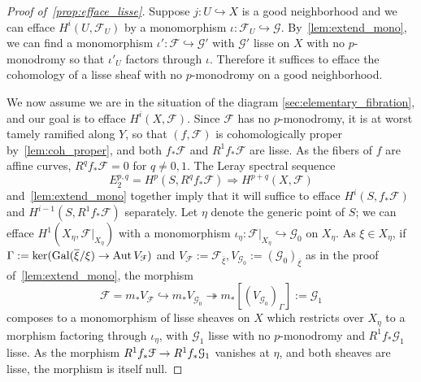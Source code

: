 \documentclass[deligne.tex]{subfiles}
\begin{document}
\begin{proof}[Proof of~\eqref{prop:efface_lisse}]
Suppose $j:U\hookrightarrow X$ is a good neighborhood and we can efface
$H^i(U,\mathcal F_U)$ by a monomorphism
$\iota:\mathcal F_U\hookrightarrow\mathcal G$.
By~\eqref{lem:extend_mono}, we can find a monomorphism
$\iota':\mathcal F\hookrightarrow\mathcal G'$ with $\mathcal G'$ 
lisse on $X$ with no $p$-monodromy so that $\iota'_U$ factors 
through $\iota$.
Therefore it suffices to efface the cohomology of a lisse sheaf with
no $p$-monodromy on a good neighborhood.

We now assume we are in the situation of the diagram 
\eqref{sec:elementary_fibration}, and our goal is to efface
$H^i(X,\mathcal F)$. Since $\mathcal F$ has no $p$-monodromy, it is at worst
tamely ramified along $Y$, so that $(f,\mathcal F)$ is cohomologically 
proper by~\eqref{lem:coh_proper}, and both $f_*\mathcal F$ and
$R^1f_*\mathcal F$ are lisse. As the fibers of $f$ are affine curves,
$R^qf_*\mathcal F=0$ for $q\ne0,1$. The Leray spectral sequence
\begin{equation*}
	E^{p,q}_2=H^p(S,R^qf_*\mathcal F)\Rightarrow H^{p+q}(X,\mathcal F)
\end{equation*}
and~\eqref{lem:extend_mono} together imply that it will suffice to efface 
$H^i(S,f_*\mathcal F)$ and $H^{i-1}(S,R^1f_*\mathcal F)$ separately.
Let $\eta$ denote the generic point of $S$; we can efface
$H^1(X_\eta,\mathcal F|_{X_\eta})$ with a monomorphism
$\iota_\eta:\mathcal F|_{X_\eta}\hookrightarrow\mathcal G_0$ on $X_\eta$.
As $\xi\in X_\eta$, if
$\Gamma:=\ker(\operatorname{Gal}(\overline\xi/\xi)\rightarrow\operatorname{Aut} V_{\mathcal F})$
and $V_{\mathcal F}:=\mathcal F_{\overline\xi},V_{\mathcal G_0}:=(\mathcal G_0)_{\overline\xi}$
as in the proof of~\eqref{lem:extend_mono}, the morphism
\begin{equation*}
	\mathcal F=m_*V_{\mathcal F}\hookrightarrow
	m_*V_{\mathcal G_0}\twoheadrightarrow
	m_*[(V_{\mathcal G_0})_\Gamma]:=\mathcal G_1
\end{equation*}
composes to a monomorphism of lisse sheaves on $X$
which restricts over $X_\eta$ to a morphism factoring through $\iota_\eta$,
with $\mathcal G_1$ lisse with no $p$-monodromy and $R^1f_*\mathcal G_1$ 
lisse. As the morphism $R^1f_*\mathcal F\rightarrow R^1f_*\mathcal G_1$ vanishes
at $\eta$, and both sheaves are lisse, the morphism is itself null.


\end{proof}
\end{document}
